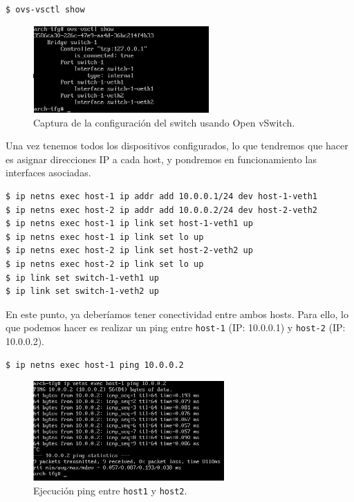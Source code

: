 \documentclass[12pt]{article}
\begin{document}
	\begin{verbatim}
$ ovs-vsctl show
	\end{verbatim}
	
	\begin{figure}[h!]
		\begin{center}
			\includegraphics[width=0.6\textwidth]{img/ns_single_1.png}
			\caption{Captura de la configuración del switch usando Open vSwitch.}
		\end{center}
	\end{figure}
	
	\noindent Una vez tenemos todos los dispositivos configurados, lo que tendremos que hacer es asignar direcciones IP a cada host, y pondremos en funcionamiento las interfaces asociadas.
	
	\begin{verbatim}
$ ip netns exec host-1 ip addr add 10.0.0.1/24 dev host-1-veth1
$ ip netns exec host-2 ip addr add 10.0.0.2/24 dev host-2-veth2
$ ip netns exec host-1 ip link set host-1-veth1 up
$ ip netns exec host-1 ip link set lo up
$ ip netns exec host-2 ip link set host-2-veth2 up
$ ip netns exec host-2 ip link set lo up
$ ip link set switch-1-veth1 up
$ ip link set switch-1-veth2 up
	\end{verbatim}

	\pagebreak

	\noindent En este punto, ya deberíamos tener conectividad entre ambos hosts. Para ello, lo que podemos hacer es realizar un ping entre \texttt{host-1} (IP: 10.0.0.1) y \texttt{host-2} (IP: 10.0.0.2).
	
	\begin{verbatim}
$ ip netns exec host-1 ping 10.0.0.2
	\end{verbatim}

	\begin{figure}[h!]
		\begin{center}
			\includegraphics[width=0.65\textwidth]{img/ns_single_2.png}
			\caption{Ejecución ping entre \texttt{host1} y \texttt{host2}.}
		\end{center}
	\end{figure}
	
\end{document}
